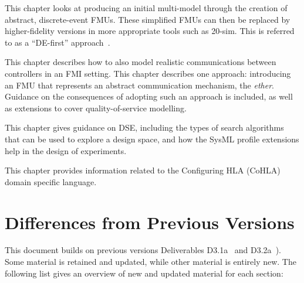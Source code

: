 \begin{description}[noitemsep]
  \item[Chapter~\ref{sec:initial}: Initial Multi-modelling] This chapter  looks at producing an initial multi-model through the creation of abstract, discrete-event FMUs. These simplified FMUs can then be replaced by higher-fidelity versions in more appropriate tools such as 20-sim. This is referred to as a ``DE-first'' approach~\cite{Fitzgerald&13b}.

  \item[Chapter~\ref{sec:networks}: Modelling Networks in Multi-models] This chapter describes how to also model realistic communications between controllers in an FMI setting. This chapter describes one approach: introducing an FMU that represents an abstract communication mechanism, the \emph{ether}. Guidance on the consequences of adopting such an approach is included, as well as extensions to cover quality-of-service modelling.

  \item[Chapter~\ref{sec:dse}: Design Space Exploration] This chapter gives guidance on DSE, including the types of search algorithms that can be used to explore a design space, and how the SysML profile extensions help in the design of experiments.
\end{description}

\item[Chapter~\ref{sec:cohla} Configuring HLA] This chapter provides information related to the Configuring HLA (CoHLA) domain specific language.


\section*{Differences from Previous Versions}
\label{sec:intro:dif}

This document builds on previous versions Deliverables D3.1a~\cite{INTOCPSD31a} and D3.2a~\cite{INTOCPSD3.2a}). Some material is retained and updated, while other material is entirely new. The following list gives an overview of new and updated material for each section:

